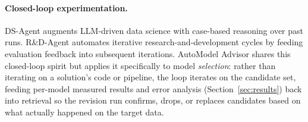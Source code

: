 \paragraph{Closed-loop experimentation.} DS-Agent \citep{guo2024dsagent} augments LLM-driven data science with case-based reasoning over past runs. R\&D-Agent \citep{yang2025rdagent} automates iterative research-and-development cycles by feeding evaluation feedback into subsequent iterations. AutoModel Advisor shares this closed-loop spirit but applies it specifically to model \emph{selection}: rather than iterating on a solution's code or pipeline, the loop iterates on the candidate set, feeding per-model measured results and error analysis (Section~\ref{sec:results}) back into retrieval so the revision run confirms, drops, or replaces candidates based on what actually happened on the target data.
